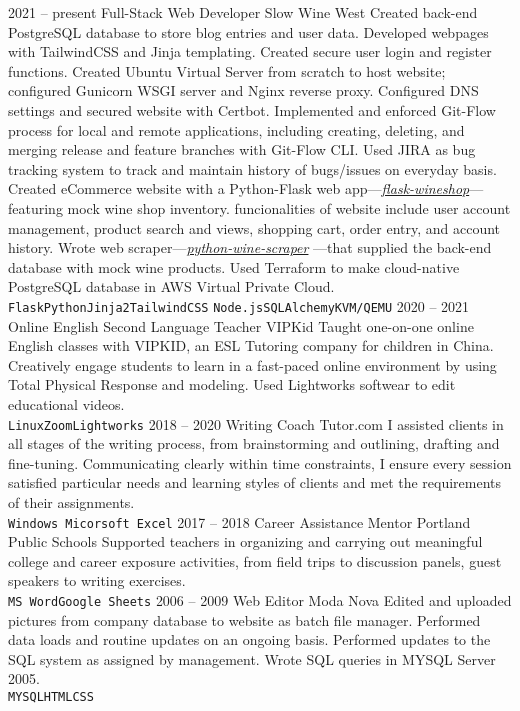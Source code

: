 \documentclass[9pt]{developercv} %
\begin{document}
\begin{entrylist}
		\entry
		{2021 -- present}
		{Full-Stack Web Developer}
		{Slow Wine West}
		{Created back-end PostgreSQL database to store blog entries and user data. Developed webpages with TailwindCSS and
		Jinja templating. Created secure user login and register functions. Created Ubuntu Virtual Server from scratch to host
		website; configured Gunicorn WSGI server and Nginx reverse proxy. Configured DNS settings and secured website with 
		Certbot. Implemented and enforced Git-Flow process for local and remote applications, including creating, deleting, and merging release and 
		feature branches with Git-Flow CLI. Used JIRA as bug tracking system to track and maintain history of bugs/issues on everyday basis. \\
		
		
		Created eCommerce website with a Python-Flask web app—{\href{https://Github.com/eriklolson/flask-wineshop}{\itshape flask-wineshop}}—
		featuring mock wine shop inventory. funcionalities of website include user account management, product search and views, shopping cart, 
		order entry, and account history. Wrote web scraper—{\href{https://Github.com/eriklolson/python-wine-scraper}{\itshape python-wine-scraper}}
		—that supplied the back-end database with mock wine products. Used Terraform to make cloud-native PostgreSQL database in AWS Virtual Private 
		Cloud.\\ \texttt{Flask}\slashsep\texttt{Python}\slashsep\texttt{Jinja2}\slashsep\texttt{TailwindCSS}
		\slashsep\texttt{Node.js}\slashsep\texttt{SQLAlchemy}\slashsep\texttt{KVM/QEMU}}
	\entry
		{2020 -- 2021}
		{Online English Second Language Teacher}
		{VIPKid}
		{Taught one-on-one online English classes with VIPKID, an ESL Tutoring company for children in China. Creatively engage students to learn in 		
		a fast-paced online environment by using Total Physical Response and modeling. Used Lightworks softwear to edit educational videos.
		\\ \texttt{Linux}\slashsep\texttt{Zoom}\slashsep\texttt{Lightworks}}
	\entry
		{2018 -- 2020}
		{Writing Coach}
		{Tutor.com}
		{I assisted clients in all stages of the writing process, from
		brainstorming and outlining, drafting and fine-tuning. Communicating clearly
		within time constraints, I ensure every session satisfied particular needs and
		learning styles of clients and met the requirements of their assignments.
		\\ \texttt{Windows}\slashsep\texttt{ Micorsoft Excel}}
	\entry
		{2017 -- 2018}
		{Career Assistance Mentor}
		{Portland Public Schools}
		{Supported teachers in organizing and carrying out meaningful college and
		career exposure activities, from field trips to discussion panels, guest
		speakers to writing exercises.
		\\ \texttt{MS Word}\slashsep\texttt{Google Sheets}}
	\entry
		{2006 -- 2009}
		{Web Editor}
		{Moda Nova}
		{Edited and uploaded pictures from company database to website as batch file manager. Performed data loads and routine updates on an ongoing
		basis. Performed updates to the SQL system as assigned by management. Wrote SQL queries in MYSQL Server 2005.
		\\ \texttt{MYSQL}\slashsep\texttt{HTML}\slashsep\texttt{CSS}}
\end{entrylist}
\end{document}

